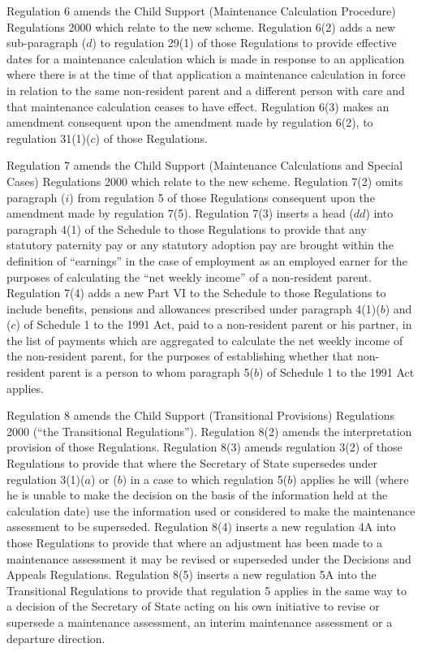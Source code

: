 \documentclass[12pt,a4paper]{article}
\begin{document}
Regulation 6 amends the Child Support (Maintenance Calculation Procedure) Regulations 2000 which relate to the new scheme. Regulation 6(2) adds a new sub-paragraph ($d$)  to regulation 29(1) of those Regulations to provide effective dates for a maintenance calculation which is made in response to an application where there is at the time of that application a maintenance calculation in force in relation to the same non-resident parent and a different person with care and that maintenance calculation ceases to have effect. Regulation 6(3) makes an amendment consequent upon the amendment made by regulation 6(2), to regulation 31(1)($c$)  of those Regulations.

Regulation 7 amends the Child Support (Maintenance Calculations and Special Cases) Regulations 2000 which relate to the new scheme. Regulation 7(2) omits paragraph ($i$)  from regulation 5 of those Regulations consequent upon the amendment made by regulation 7(5). Regulation 7(3) inserts a head ($dd$)  into paragraph 4(1) of the Schedule to those Regulations to provide that any statutory paternity pay or any statutory adoption pay are brought within the definition of “earnings” in the case of employment as an employed earner for the purposes of calculating the “net weekly income” of a non-resident parent. Regulation 7(4) adds a new Part VI to the Schedule to those Regulations to include benefits, pensions and allowances prescribed under paragraph 4(1)($b$)  and ($c$)  of Schedule 1 to the 1991 Act, paid to a non-resident parent or his partner, in the list of payments which are aggregated to calculate the net weekly income of the non-resident parent, for the purposes of establishing whether that non-resident parent is a person to whom paragraph 5($b$)  of Schedule 1 to the 1991 Act applies.

Regulation 8 amends the Child Support (Transitional Provisions) Regulations 2000 (“the Transitional Regulations”). Regulation 8(2) amends the interpretation provision of those Regulations. Regulation 8(3) amends regulation 3(2) of those Regulations to provide that where the Secretary of State supersedes under regulation 3(1)($a$)  or ($b$)  in a case to which regulation 5($b$)  applies he will (where he is unable to make the decision on the basis of the information held at the calculation date) use the information used or considered to make the maintenance assessment to be superseded. Regulation 8(4) inserts a new regulation 4A into those Regulations to provide that where an adjustment has been made to a maintenance assessment it may be revised or superseded under the Decisions and Appeals Regulations. Regulation 8(5) inserts a new regulation 5A into the Transitional Regulations to provide that regulation 5 applies in the same way to a decision of the Secretary of State acting on his own initiative to revise or supersede a maintenance assessment, an interim maintenance assessment or a departure direction.
\end{document}
